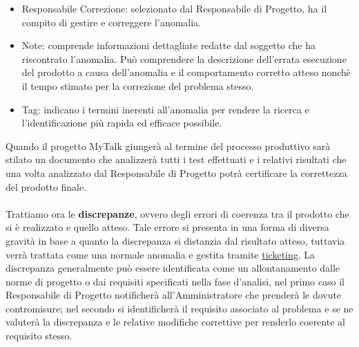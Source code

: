 \begin{itemize}
\item Responsabile Correzione: selezionato dal Responsabile di Progetto, ha il compito di gestire e correggere l'anomalia.
\item Note: comprende informazioni dettagliate redatte dal soggetto che ha riscontrato l'anomalia. Può comprendere la descrizione dell'errata esecuzione del prodotto a causa dell'anomalia e il comportamento corretto atteso nonchè il tempo stimato per la correzione del problema stesso. 
\item Tag: indicano i termini inerenti all'anomalia per rendere la ricerca e l'identificazione più rapida ed efficace possibile.
\end{itemize}
Quando il progetto MyTalk giungerà al termine del processo produttivo sarà stilato un documento che analizzerà tutti i test effettuati e i relativi risultati che una volta analizzato dal Responsabile di Progetto potrà certificare la correttezza del prodotto finale.\\\\
Trattiamo ora le \textbf{discrepanze}, ovvero degli errori di coerenza tra il prodotto che si è realizzato e quello atteso. Tale errore si presenta in una forma di diversa gravità in base a quanto la discrepanza si distanzia dal risultato atteso, tuttavia verrà trattata come una normale anomalia e gestita tramite \underline{ticketing}.
La discrepanza generalmente può essere identificata come un allontanamento dalle norme di progetto o dai requisiti specificati nella fase d'analisi, nel primo caso il Responsabile di Progetto notificherà all'Amministratore che prenderà le dovute contromisure; nel secondo si identificherà il requisito associato al problema e se ne valuterà la discrepanza e le relative modifiche correttive per renderlo coerente al requisito stesso.

